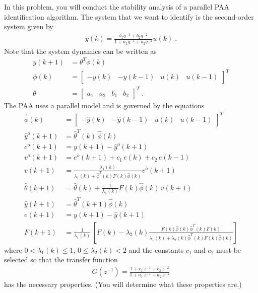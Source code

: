 \item
In this problem, you will conduct the stability analysis of a parallel  PAA identification algorithm. The system that we want to identify is the second-order system given by
\begin{align*}
    y(k) = \frac{b_1q^{-1} + b_2 q^{-2}}{1 + a_1 q^{-1} + a_2 q^{-2}} u(k) \; .
\end{align*}
Note that the system dynamics can be written as
\begin{align*}
    y(k+1) & = \theta^T \phi(k) \\
    \phi(k) & = \begin{bmatrix}
            -y(k) & -y(k-1) & u(k) & u(k-1)
        \end{bmatrix}^T \\
    \theta & = \begin{bmatrix}
            a_1 & a_2 & b_1 & b_2
        \end{bmatrix}^T \; .
\end{align*}
The PAA uses a parallel model and is governed by the equations
\begin{align}
    \hat{\phi}(k) & = \begin{bmatrix}
            -\hat{y}(k) & -\hat{y}(k-1) & u(k) & u(k-1)
        \end{bmatrix}^T
        \label{eq:parallel_PAA_first} \\
    \hat{y}^o(k+1) & = \hat{\theta}^T(k) \, \hat{\phi}(k) \\
    e^o(k+1) & =  y(k+1) - \hat{y}^o(k+1) \\
    v^o(k+1) & = e^o(k+1) + c_1 \, e(k) + c_2 \, e(k-1) \\
    v(k+1) & = \frac{ \lambda_1(k) }{ \lambda_1(k) + \hat{\phi}^T(k) F(k) \hat{\phi}(k) } v^o(k+1) \\    \hat{\theta}(k+1) & = \hat{\theta}(k) + \frac{1}{\lambda_1(k)} F(k) \hat{\phi}(k)\,v(k+1) \\
    \hat{y} (k+1) & = \hat{\theta}^T(k+1) \hat{\phi}(k) \\
    e(k+1) & = y(k+1) - \hat{y}(k+1) \\
    F(k+1) & = \frac{1}{\lambda_1(k)} \, \left[ F(k) - \lambda_2(k)
        \frac{ F(k) \hat{\phi}(k) \hat{\phi}^T(k)F(k) }
        { \lambda_1(k) + \lambda_2(k) \hat{\phi}^T(k)F(k) \hat{\phi}(k) } \right]
        \label{eq:parallel_PAA_last}
\end{align}
where $0 < \lambda_1(k) \leq 1$, $0 \leq \lambda_2(k) < 2$ and the constants $c_1$ and $c_2$ must be selected so that the transfer function
\begin{align}
    \label{eq:gq}
    G(z^{-1}) = \frac{1 + c_1 \, z^{-1} + c_2\, z^{-2}}{ 1 + a_1 \, z^{-1} + a_2\, z^{-2}}
\end{align}
has the necessary properties. (You will determine what these properties are.)


